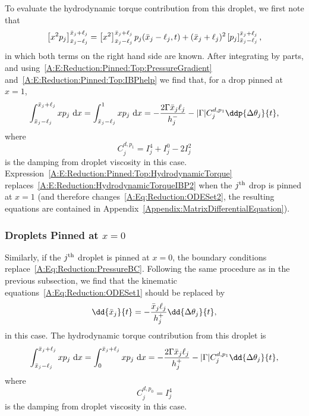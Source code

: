 \begin{subappendices}
To evaluate the hydrodynamic torque contribution from this droplet, we first note that
\begin{equation}\label{A:E:Reduction:Pinned:Top:IBPhelp}
\left[x^2 p_j\right]^{\bar{x}_j + \ell_j}
_{\bar{x}_j - \ell_j} = \left[x^2 \right]^{\bar{x}_j + \ell_j}
_{\bar{x}_j - \ell_j}p_j(\bar{x}_j -\ell_j,t) + (\bar{x}_j + \ell_j)^2\left[ p_j\right]^{\bar{x}_j + \ell_j}
_{\bar{x}_j - \ell_j},
\end{equation}
in which both terms on the right hand side are known. After integrating by parts, and using~\eqref{A:E:Reduction:Pinned:Top:PressureGradient} and~\eqref{A:E:Reduction:Pinned:Top:IBPhelp} we find that, for a drop pinned at $x = 1$,
\begin{equation}\label{A:E:Reduction:Pinned:Top:HydrodynamicTorque}
\int^{\xbarj + \ell_j}_{\xbar_j - \ell_j} x p_j~\mathrm{d}x  =\int^{1}_{\xbarj - \ellj} x p_j~\mathrm{d}x= -\frac{2\Gamma\xbar_j \ell_j}{h_j^-} - |\Gamma|C_j^{d,p_1}\ddp{\Delta \theta_{j}}{t},
\end{equation}
where
\begin{equation}
C_j^{d,p_1} = I_j^4 + I_j^0 - 2I_j^2
\end{equation}
is the damping from droplet viscosity in this case. Expression~\eqref{A:E:Reduction:Pinned:Top:HydrodynamicTorque} replaces~\eqref{A:E:Reduction:HydrodynamicTorqueIBP2} when the $j^{\text{th}}$ drop is pinned at $x = 1$ (and therefore changes~\eqref{A:Eq:Reduction:ODESet2}, the resulting equations are contained in Appendix~\ref{Appendix:MatrixDifferentialEquation}).
\subsubsection{Droplets Pinned at $x = 0$}
Similarly, if the $j^{\text{th}}$ droplet is pinned at $x = 0$, the boundary conditions
replace~\eqref{A:Eq:Reduction:PressureBC}. Following the same procedure as in the previous subsection, we find that the kinematic equations~\eqref{A:Eq:Reduction:ODESet1} should be replaced by
\begin{equation}\label{A:E:Reduction:Pinned:Bottom:KinematicEquations}
\dd{\xbar_j}{t} =- \frac{\xbar_j\ell_j}{h_j^+}\dd{\Delta \theta_{j}}{t},
\end{equation}
 in this case. The hydrodynamic torque contribution from this droplet is
 \begin{equation}
 \int^{\xbarj + \ell_j}_{\xbar_j - \ell_j} x p_j~\mathrm{d}x  = \int^{\xbarj + \ell_j}_{0} x p_j~\mathrm{d}x = -\frac{2\Gamma\xbar_j \ell_j}{h_j^+} - |\Gamma|C_j^{d,p_1}\dd{\Delta \theta_{j}}{t},
\end{equation}
where
\begin{equation}
C_j^{d,p_0} = I_j^4
\end{equation}
is the damping from droplet viscosity in this case.


\end{subappendices}
